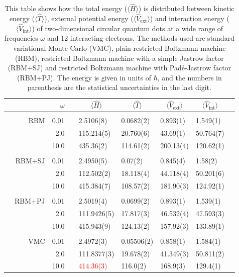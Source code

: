 \begin{table}
	\caption{This table shows how the total energy ($\langle\hat{H}\rangle$) is distributed between kinetic energy ($\langle\hat{T}\rangle$), external potential energy ($\langle\hat{V}_{\text{ext}}\rangle$) and interaction energy ($\langle\hat{V}_{\text{int}}\rangle$) of two-dimensional circular quantum dots at a wide range of frequencies $\omega$ and 12 interacting electrons. The methods used are standard variational Monte-Carlo (VMC), plain restricted Boltzmann machine (RBM), restricted Boltzmann machine with a simple Jastrow factor (RBM+SJ) and restricted Boltzmann machine with Padé-Jastrow factor (RBM+PJ). The energy is given in units of $\hbar$, and the numbers in parenthesis are the statistical uncertainties in the last digit.}
	\label{tab:splitfrequencyQD12P}
	\begin{tabularx}{\textwidth}{R{0.5cm}rrcR{2.3cm}R{2.3cm}R{2.3cm}R{2.3cm}R{0.3cm}} \hline\hline
		&\makecell{\\ \phantom{$N$} \\ \phantom{=}} & $\omega$ &&  &  &  &  \\ \hline \\
		&RBM & 0.01 && 2.5106(8) & 0.0682(2) & 0.893(1) & 1.549(1) \\
		&& 2.0 && 115.214(5) & 20.760(6) & 43.69(1) & 50.764(7) \\
		&& 10.0 && 435.36(2) & 114.61(2) & 200.13(4) & 120.62(1) \\
 		\hdashline \\
		
		&RBM+SJ & 0.01 && 2.4950(5) & 0.07(2) & 0.845(4) & 1.58(2) \\
		&& 2.0 && 112.502(2) & 18.118(4) & 44.118(4) & 50.201(6) \\
		&& 10.0 && 415.384(7) & 108.57(2) & 181.90(3) & 124.92(1) \\
 		\hdashline \\
		
		&RBM+PJ & 0.01 && 2.5019(4) & 0.0699(2) & 0.893(1) & 1.539(1) \\
		&& 2.0 && 111.9426(5) & 17.817(3) & 46.532(4) & 47.593(3) \\
		&& 10.0 && 415.943(9) & 124.13(2) & 157.92(3) & 133.89(1) \\ \hdashline \\
		
		&VMC & 0.01 && 2.4972(3) & 0.05506(2) & 0.858(1) & 1.584(1)\\
		&& 2.0 && 111.8377(3) & 19.678(2) & 41.349(3) & 50.811(2) \\
		&& 10.0 && \textcolor{red}{414.36(3)} & 116.0(2) & 168.9(3) & 129.4(1) \\
		\hline\hline
	\end{tabularx}
\end{table}
\fi

